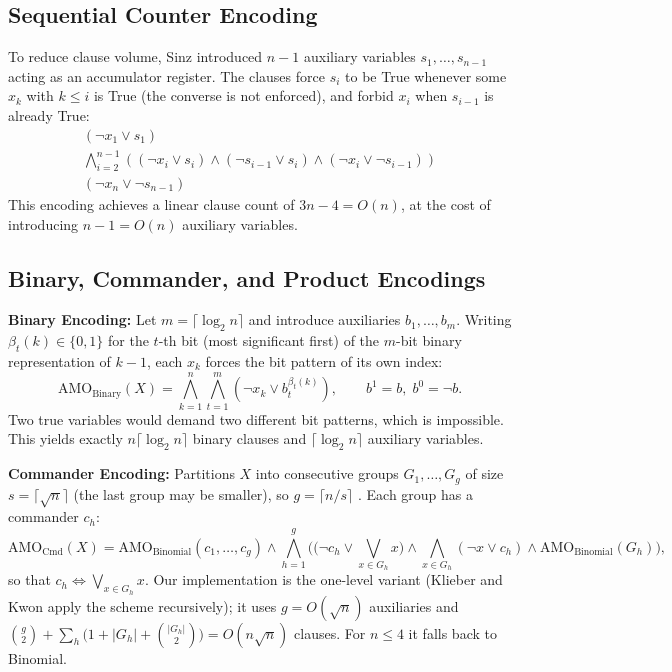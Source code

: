 \documentclass[a4paper,fleqn]{cas-sc}
\begin{document}
\subsection{Sequential Counter Encoding}
To reduce clause volume, Sinz \cite{sinz2005towards} introduced $n-1$ auxiliary variables $s_1, \dots, s_{n-1}$ acting as an accumulator register. The clauses force $s_i$ to be True whenever some $x_k$ with $k \leq i$ is True (the converse is not enforced), and forbid $x_i$ when $s_{i-1}$ is already True:
\begin{align}
    (\neg x_1 \vee s_1) \label{eq:seq1} \\
    \bigwedge_{i=2}^{n-1} \left( (\neg x_i \vee s_i) \wedge (\neg s_{i-1} \vee s_i) \wedge (\neg x_i \vee \neg s_{i-1}) \right) \label{eq:seq2} \\
    (\neg x_n \vee \neg s_{n-1}) \label{eq:seq3}
\end{align}
This encoding achieves a linear clause count of $3n - 4 = O(n)$, at the cost of introducing $n-1 = O(n)$ auxiliary variables.

\subsection{Binary, Commander, and Product Encodings}
\textbf{Binary Encoding:} Let $m = \lceil \log_2 n \rceil$ and introduce auxiliaries $b_1, \dots, b_m$. Writing $\beta_t(k) \in \{0,1\}$ for the $t$-th bit (most significant first) of the $m$-bit binary representation of $k-1$, each $x_k$ forces the bit pattern of its own index:
\begin{equation}
    \mathrm{AMO}_{\text{Binary}}(X) = \bigwedge_{k=1}^{n} \bigwedge_{t=1}^{m} \left(\neg x_k \vee b_t^{\beta_t(k)}\right), \qquad b^{1} = b,\; b^{0} = \neg b .
\end{equation}
Two true variables would demand two different bit patterns, which is impossible. This yields exactly $n\lceil \log_2 n \rceil$ binary clauses and $\lceil \log_2 n \rceil$ auxiliary variables.

\textbf{Commander Encoding:} Partitions $X$ into consecutive groups $G_1, \dots, G_g$ of size $s = \lceil\sqrt{n}\rceil$ (the last group may be smaller), so $g = \lceil n/s \rceil$ \cite{klieber2007efficient}. Each group has a commander $c_h$:
\begin{equation}
    \mathrm{AMO}_{\text{Cmd}}(X) = \mathrm{AMO}_{\text{Binomial}}(c_1, \dots, c_g) \wedge \bigwedge_{h=1}^{g} \Big( \big(\neg c_h \vee \textstyle\bigvee_{x \in G_h} x\big) \wedge \bigwedge_{x \in G_h} (\neg x \vee c_h) \wedge \mathrm{AMO}_{\text{Binomial}}(G_h) \Big),
\end{equation}
so that $c_h \Leftrightarrow \bigvee_{x \in G_h} x$. Our implementation is the one-level variant (Klieber and Kwon apply the scheme recursively); it uses $g = O(\sqrt{n})$ auxiliaries and $\binom{g}{2} + \sum_h \big(1 + |G_h| + \binom{|G_h|}{2}\big) = O(n\sqrt{n})$ clauses. For $n \leq 4$ it falls back to Binomial.
\end{document}

